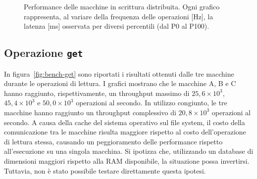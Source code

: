 \begin{figure}[htbp]
    \caption{Performance delle macchine in scrittura distribuita. Ogni grafico rappresenta, al variare della frequenza delle operazioni [Hz], la latenza [ms] osservata per diversi percentili (dal P0 al P100).}
    \label{fig:bench-set-all}
\end{figure}

\subsection{Operazione \texttt{get}}
\label{subsec:risultati-get}

In figura~\ref{fig:bench-get} sono riportati i risultati ottenuti dalle tre macchine durante le operazioni di lettura.  
I grafici mostrano che le macchine A, B e C hanno raggiunto, rispettivamente, un throughput massimo di $25{,}6 \times 10^3$, $45{,}4 \times 10^3$ e $50{,}0 \times 10^3$ operazioni al secondo. In utilizzo congiunto, le tre macchine hanno raggiunto un throughput complessivo di $20{,}8 \times 10^3$ operazioni al secondo.
A causa della cache del sistema operativo sul file system, il costo della comunicazione tra le macchine risulta maggiore rispetto al costo dell'operazione di lettura stessa, causando un peggioramento delle performance rispetto all'esecuzione su una singola macchina.  
Si ipotizza che, utilizzando un database di dimensioni maggiori rispetto alla RAM disponibile, la situazione possa invertirsi. Tuttavia, non è stato possibile testare direttamente questa ipotesi.

